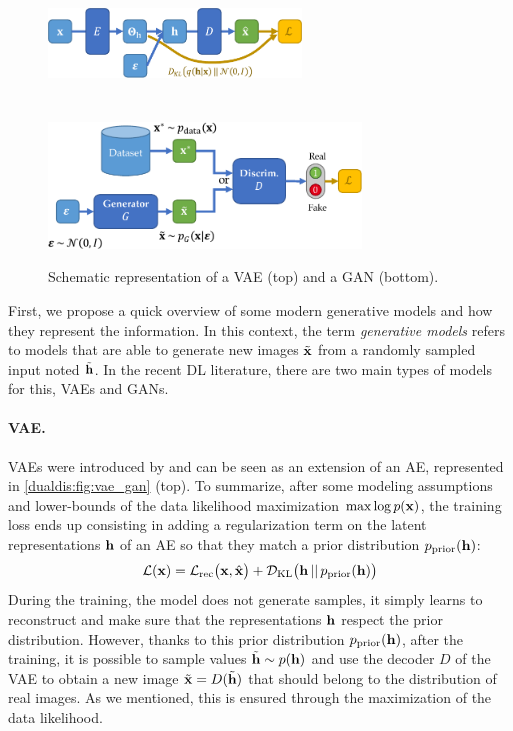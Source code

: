 \begin{figure}[tb]
    \centering
    \includegraphics[width=0.6\textwidth]{images/dualdis_vae}\\
    ~\\
    ~\\
    \includegraphics[width=0.74\textwidth]{images/dualdis_gan}
    \caption[Schematic representation of \acs{VAE} and \acs{GAN}]{Schematic representation of a \acs{VAE} (top) and a \acs{GAN} (bottom).}
    \label{dualdis:fig:vae_gan}
\end{figure}

First, we propose a quick overview of some modern generative models and how they represent the information.
In this context, the term \textit{generative models} refers to models that are able to generate new images $\tilde{\mathbf{x}}$ from a randomly sampled input noted $\tilde{\mathbf{h}}$. In the recent \acf{DL} literature, there are two main types of models for this, \acfp{VAE} and \acfp{GAN}.

\paragraph{\acl{VAE}.} \acp{VAE} were introduced by \citet{Kingma2013} and can be seen as an extension of an \ac{AE}, represented in \autoref{dualdis:fig:vae_gan} (top). To summarize, after some modeling assumptions and lower-bounds of the data likelihood maximization $\max \log p(\mathbf{x})$, the training loss ends up consisting in adding a regularization term on the latent representations $\mathbf{h}$ of an \ac{AE} so that they match a prior distribution $p_\mathrm{prior}(\mathbf{h})$:
\begin{equation}
    \mathcal{L}(\mathbf{x}) = \mathcal{L}_\mathrm{rec} \big(\mathbf{x}, \hat{\mathbf{x}} \big) + \mathcal{D}_\mathrm{KL}\big( \mathbf{h}\,||\,p_\mathrm{prior}(\mathbf{h}) \big)
\end{equation}
During the training, the model does not generate samples, it simply learns to reconstruct and make sure that the representations $\mathbf{h}$ respect the prior distribution. However, thanks to this prior distribution $p_\mathrm{prior}(\mathbf{h})$, after the training, it is possible to sample values $\tilde{\mathbf{h}}\sim p(\mathbf{h})$ and use the decoder $D$ of the \ac{VAE} to obtain a new image $\tilde{\mathbf{x}}=D(\tilde{\mathbf{h}})$ that should belong to the distribution of real images. As we mentioned, this is ensured through the maximization of the data likelihood.

